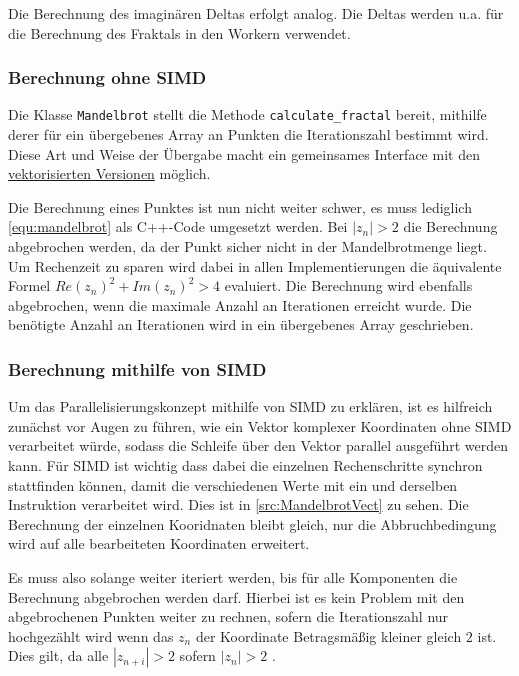 Die Berechnung des imaginären Deltas erfolgt analog.
Die Deltas werden u.a. für die Berechnung des Fraktals in den Workern verwendet.

\subsubsection{Berechnung ohne SIMD}

Die Klasse \verb|Mandelbrot| stellt die Methode \verb|calculate_fractal| bereit,
mithilfe derer für ein übergebenes Array an Punkten die Iterationszahl bestimmt wird.
Diese Art und Weise der Übergabe macht ein gemeinsames Interface mit den \hyperref[subsec:simd]{vektorisierten Versionen} möglich.

Die Berechnung eines Punktes ist nun nicht weiter schwer, es muss lediglich \autoref{equ:mandelbrot} als C++-Code umgesetzt werden.
Bei $|z_n| > 2$ die Berechnung abgebrochen werden, da der Punkt sicher nicht in der Mandelbrotmenge liegt.
Um Rechenzeit zu sparen wird dabei in allen Implementierungen die äquivalente Formel $Re(z_n)^2 + Im(z_n)^2 > 4$ evaluiert.
Die Berechnung wird ebenfalls abgebrochen, wenn die maximale Anzahl an Iterationen erreicht wurde.
Die benötigte Anzahl an Iterationen wird in ein übergebenes Array geschrieben.

\subsubsection{Berechnung mithilfe von SIMD}\label{subsec:simd}

Um das Parallelisierungskonzept mithilfe von SIMD zu erklären,
ist es hilfreich zunächst vor Augen zu führen, wie ein Vektor komplexer Koordinaten ohne SIMD verarbeitet würde,
sodass die Schleife über den Vektor parallel ausgeführt werden kann.
Für SIMD ist wichtig dass dabei die einzelnen Rechenschritte synchron stattfinden können,
damit die verschiedenen Werte mit ein und derselben Instruktion verarbeitet wird.
Dies ist in \autoref{src:MandelbrotVect} zu sehen.
Die Berechnung der einzelnen Kooridnaten bleibt gleich, nur die Abbruchbedingung wird auf alle bearbeiteten Koordinaten erweitert.

Es muss also solange weiter iteriert werden, bis für alle Komponenten die Berechnung abgebrochen werden darf.
Hierbei ist es kein Problem mit den abgebrochenen Punkten weiter zu rechnen, sofern die
Iterationszahl nur hochgezählt wird wenn das $z_n$ der Koordinate Betragsmäßig kleiner gleich $2$ ist.
Dies gilt, da alle $|z_{n+i}| > 2$ sofern $|z_n| > 2$ \cite{424331}.

